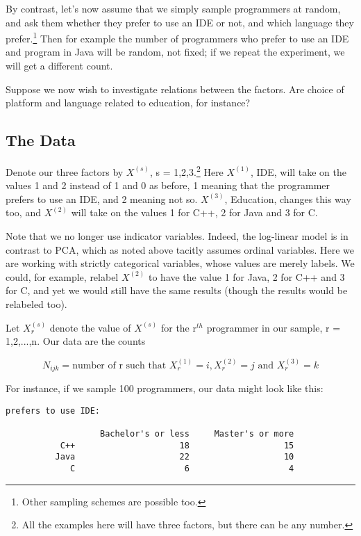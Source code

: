 By contrast, let's now assume that we simply sample programmers at
random, and ask them whether they prefer to use an IDE or not, and which
language they prefer.\footnote{Other sampling schemes are possible too.}
Then for example the number of programmers who prefer to use an IDE and
program in Java will be random, not fixed; if we repeat the experiment,
we will get a different count.

Suppose we now wish to investigate relations between the factors.
Are choice of platform and language related to education, for instance?

\subsection{The Data}

Denote our three factors by $X^{(s)}$, s = 1,2,3.\footnote{All the
examples here will have three factors, but there can be any number.}
Here $X^{(1)}$, IDE, will take on the values 1 and 2 instead of 1 and 0
as before, 1 meaning that the programmer prefers to use an IDE, and 2
meaning not so.  $X^{(3)}$, Education, changes this way too, and
$X^{(2)}$ will take on the values 1 for C++, 2 for Java and 3 for C.  

Note that we no longer use indicator variables.  Indeed, the log-linear
model is in contrast to PCA, which as noted above tacitly assumes
ordinal variables.  Here we are working with strictly categorical
variables, whose values are merely labels.  We could, for example,
relabel $X^{(2)}$ to have the value 1 for Java, 2 for C++ and 3 for C,
and yet we would still have the same results (though the results would
be relabeled too).

Let $X_r^{(s)}$ denote the value of $X^{(s)}$ for the r$^{th}$
programmer in our sample, r = 1,2,...,n.  Our data are the counts

\begin{equation}
N_{ijk} = \textrm{number of r such that } X_r^{(1)} = i, X_r^{(2)} = j
\textrm{ and } X_r^{(3)} = k
\end{equation}

For instance, if we sample 100 programmers, our data might look like
this:

\begin{Verbatim}[fontsize=\relsize{-2}]
prefers to use IDE:

                   Bachelor's or less     Master's or more
           C++                     18                   15
          Java                     22                   10
             C                      6                    4
\end{Verbatim}

